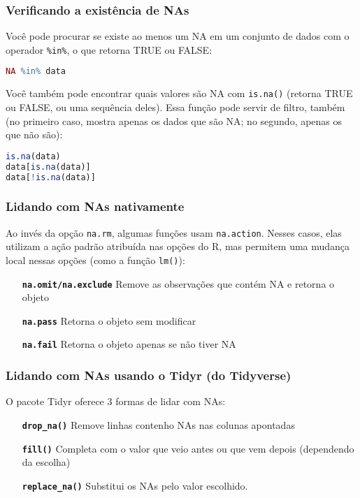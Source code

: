 \documentclass{book}
\begin{document}
\subsubsection{Verificando a existência de NAs}
Você pode procurar se existe ao menos um NA em um conjunto de dados com o operador \texttt{\%in\%}, o que retorna TRUE ou FALSE:

\lstset{style=ex1linha}
\begin{lstlisting}[language=R]
NA %in% data
\end{lstlisting}

Você também pode encontrar quais valores são NA com \texttt{is.na()} (retorna TRUE ou FALSE, ou uma sequência deles). Essa função pode servir de filtro, também (no primeiro caso, mostra apenas os dados que são NA; no segundo, apenas os que não são):

\lstset{style=ex1linha}
\begin{lstlisting}[language=R]
is.na(data)
data[is.na(data)]
data[!is.na(data)]
\end{lstlisting}

\subsubsection{Lidando com NAs nativamente}
Ao invés da opção \texttt{na.rm}, algumas funções usam \texttt{na.action}. Nesses casos, elas utilizam a ação padrão atribuída nas opções do R, mas permitem uma mudança local nessas opções (como a função \texttt{lm()}):

\begin{itemize}
  \item[\textbf{\texttt{na.omit/na.exclude}}] Remove as observações que contém NA e retorna o objeto
  \item[\textbf{\texttt{na.pass}}] Retorna o objeto sem modificar
  \item[\textbf{\texttt{na.fail}}] Retorna o objeto apenas se não tiver NA
\end{itemize}

\subsubsection{Lidando com NAs usando o Tidyr (do Tidyverse)}
O pacote Tidyr oferece 3 formas de lidar com NAs:

\begin{itemize}
  \item[\textbf{\texttt{drop\_na()}}] Remove linhas contenho NAs nas colunas apontadas
  \item[\textbf{\texttt{fill()}}] Completa com o valor que veio antes ou que vem depois (dependendo da escolha)
  \item[\textbf{\texttt{replace\_na()}}] Substitui os NAs pelo valor escolhido.
\end{itemize}
\end{document}

